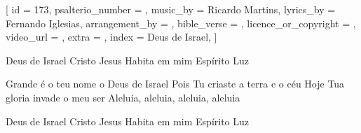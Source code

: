 
[
    id                     = {173},
    psalterio_number       = {},
    music_by               = {Ricardo Martins},
    lyrics_by              = {Fernando Iglesias},
    arrangement_by         = {},
    bible_verse            = {},
    licence_or_copyright   = {},
    video_url              = {},
    extra                  = {},
    index                  = {Deus de Israel},
]


\beginverse
Deus de Israel
Cristo Jesus
Habita em mim
Espírito Luz
\endverse

\beginverse
Grande é o teu nome o Deus de Israel
Pois Tu criaste a terra e o céu
Hoje Tua gloria invade o meu ser
Aleluia, aleluia, aleluia, aleluia
\endverse

\beginverse
Deus de Israel
Cristo Jesus
Habita em mim
Espírito Luz
\endverse


\endsong
